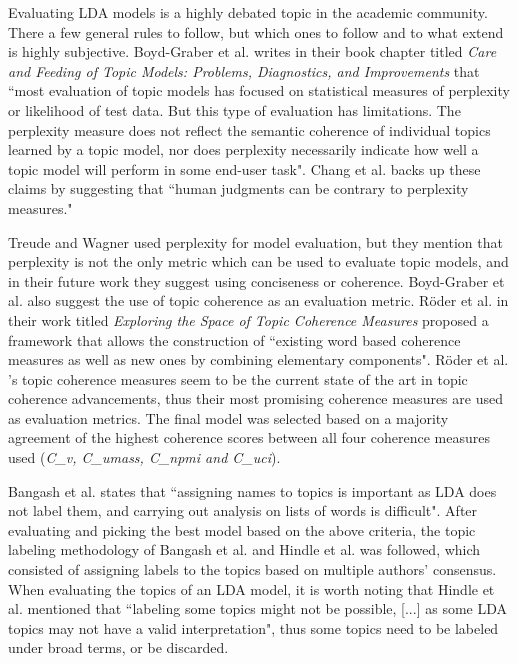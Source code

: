         Evaluating LDA models is a highly debated topic in the academic community. There a few general rules to follow, but which ones to follow and to what extend is highly subjective. Boyd-Graber et al. \cite{boyd2014care} writes in their book chapter titled \textit{Care and Feeding of Topic Models: Problems, Diagnostics, and Improvements} that ``most evaluation of topic models has focused on statistical measures of perplexity or likelihood of test data. But this type of evaluation has limitations. The perplexity measure does not reflect the semantic coherence of individual topics learned by a topic model, nor does perplexity necessarily indicate how well a topic model will perform in some end-user task". Chang et al. \cite{chang2009reading} backs up these claims by suggesting that ``human judgments can be contrary to perplexity measures." 
        
        Treude and Wagner \cite{treude2019predicting} used perplexity for model evaluation, but they mention that perplexity is not the only metric which can be used to evaluate topic models, and in their future work they suggest using conciseness or coherence. Boyd-Graber et al. \cite{boyd2014care} also suggest the use of topic coherence as an evaluation metric. R{\"o}der et al. \cite{roder2015exploring} in their work titled \textit{Exploring the Space of Topic Coherence Measures} proposed a framework that allows the construction of ``existing word based coherence measures as well as new ones by combining elementary components". R{\"o}der et al. \cite{roder2015exploring}'s topic coherence measures seem to be the current state of the art in topic coherence advancements, thus their most promising coherence measures are used as evaluation metrics. The final model was selected based on a majority agreement of the highest coherence scores between all four coherence measures used (\emph{C\_v, C\_umass, C\_npmi and C\_uci}).
        
        Bangash et al. \cite{bangash2019developers} states that ``assigning names to topics is important as LDA does not label them, and carrying out analysis on lists of words is difficult". After evaluating and picking the best model based on the above criteria, the topic labeling methodology of Bangash et al. \cite{bangash2019developers} and Hindle et al. \cite{hindle2012relating} was followed, which consisted of assigning labels to the topics based on multiple authors’ consensus. When evaluating the topics of an LDA model, it is worth noting that Hindle et al. \cite{hindle2012relating} mentioned that ``labeling some topics might not be possible, [...] as some LDA topics may not have a valid interpretation", thus some topics need to be labeled under broad terms, or be discarded.

